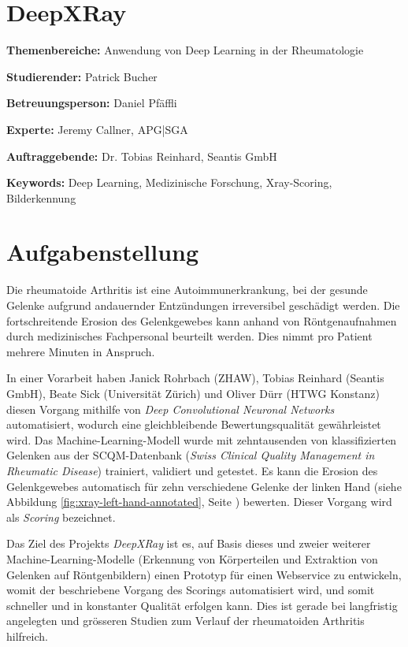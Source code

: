 \documentclass[a4paper,10pt,hidelinks]{scrartcl}
\newcommand{\imgref}[1]{{Abbildung \ref{#1}, Seite \pageref{#1}}}
\begin{document}
\section*{\fontsize{18}{20}\selectfont DeepXRay}
\thispagestyle{firstpage}

\textbf{Themenbereiche:} \tabto{4cm} Anwendung von Deep Learning in der Rheumatologie

\noindent
\textbf{Studierender:} \tabto{4cm} Patrick Bucher

\noindent
\textbf{Betreuungsperson:} \tabto{4cm} Daniel Pfäffli

\noindent
\textbf{Experte:} \tabto{4cm} Jeremy Callner, APG|SGA

\noindent
\textbf{Auftraggebende:} \tabto{4cm} Dr. Tobias Reinhard, Seantis GmbH

\noindent
\textbf{Keywords:} \tabto{4cm} Deep Learning, Medizinische Forschung, Xray-Scoring, Bilderkennung

\section{\fontsize{14}{16}\selectfont Aufgabenstellung}

Die rheumatoide Arthritis ist eine Autoimmunerkrankung, bei der gesunde Gelenke aufgrund andauernder Entzündungen irreversibel geschädigt werden. Die fortschreitende Erosion des Gelenkgewebes kann anhand von Röntgenaufnahmen durch medizinisches Fachpersonal beurteilt werden. Dies nimmt pro Patient mehrere Minuten in Anspruch.

In einer Vorarbeit haben Janick Rohrbach (ZHAW), Tobias Reinhard (Seantis GmbH), Beate Sick (Universität Zürich) und Oliver Dürr (HTWG Konstanz) diesen Vorgang mithilfe von \textit{Deep Convolutional Neuronal Networks} automatisiert, wodurch eine gleichbleibende Bewertungsqualität gewährleistet wird. Das Machine-Learning-Modell wurde mit zehntausenden von klassifizierten Gelenken aus der SCQM-Datenbank (\textit{Swiss Clinical Quality Management in Rheumatic Disease}) trainiert, validiert und getestet. Es kann die Erosion des Gelenkgewebes automatisch für zehn verschiedene Gelenke der linken Hand (siehe \imgref{fig:xray-left-hand-annotated}) bewerten. Dieser Vorgang wird als \textit{Scoring} bezeichnet.

Das Ziel des Projekts \textit{DeepXRay} ist es, auf Basis dieses und zweier weiterer Machine-Learning-Modelle (Erkennung von Körperteilen und Extraktion von Gelenken auf Röntgenbildern) einen Prototyp für einen Webservice zu entwickeln, womit der beschriebene Vorgang des Scorings automatisiert wird, und somit schneller und in konstanter Qualität erfolgen kann. Dies ist gerade bei langfristig angelegten und grösseren Studien zum Verlauf der rheumatoiden Arthritis hilfreich.
\end{document}
